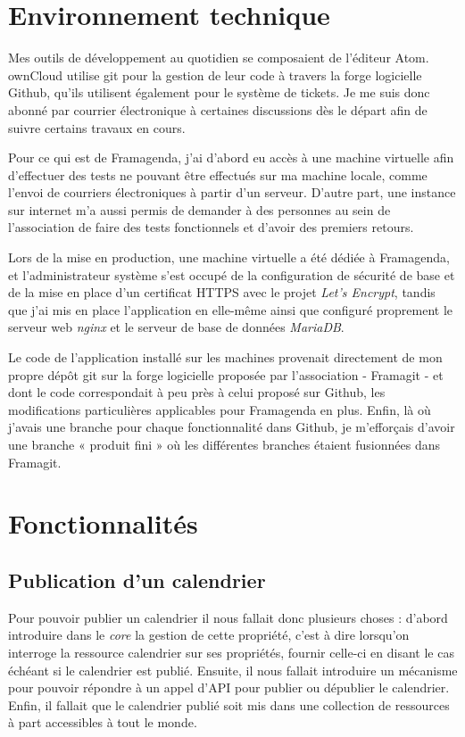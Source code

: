 \documentclass[10pt,a4paper]{report}
\begin{document}
	\section{Environnement technique}
	Mes outils de développement au quotidien se composaient de l'éditeur Atom. ownCloud utilise git pour la gestion de leur code à travers la forge logicielle Github, qu'ils utilisent également pour le système de tickets. Je me suis donc abonné par courrier électronique à certaines discussions dès le départ afin de suivre certains travaux en cours.
	
	Pour ce qui est de Framagenda, j'ai d'abord eu accès à une machine virtuelle afin d'effectuer des tests ne pouvant être effectués sur ma machine locale, comme l'envoi de courriers électroniques à partir d'un serveur. D'autre part, une instance sur internet m'a aussi permis de demander à des personnes au sein de l'association de faire des tests fonctionnels et d'avoir des premiers retours.
	
	Lors de la mise en production, une machine virtuelle a été dédiée à Framagenda, et l'administrateur système s'est occupé de la configuration de sécurité de base et de la mise en place d'un certificat \textsc{HTTPS} avec le projet \textit{Let's Encrypt}, tandis que j'ai mis en place l'application en elle-même ainsi que configuré proprement le serveur web \textit{nginx} et le serveur de base de données \textit{MariaDB}.
	
	Le code de l'application installé sur les machines provenait directement de mon propre dépôt git sur la forge logicielle proposée par l'association - Framagit - et dont le code correspondait à peu près à celui proposé sur Github, les modifications particulières applicables pour Framagenda en plus. Enfin, là où j'avais une branche pour chaque fonctionnalité dans Github, je m'efforçais d'avoir une branche « produit fini » où les différentes branches étaient fusionnées dans Framagit.
	
	\section{Fonctionnalités}
	\subsection{Publication d'un calendrier}
	Pour pouvoir publier un calendrier il nous fallait donc plusieurs choses : d'abord introduire dans le \textit{core} la gestion de cette propriété, c'est à dire lorsqu'on interroge la ressource calendrier sur ses propriétés, fournir celle-ci en disant le cas échéant si le calendrier est publié.
	Ensuite, il nous fallait introduire un mécanisme pour pouvoir répondre à un appel d'API pour publier ou dépublier le calendrier. Enfin, il fallait que le calendrier publié soit mis dans une collection de ressources à part accessibles à tout le monde.
	
\end{document}
